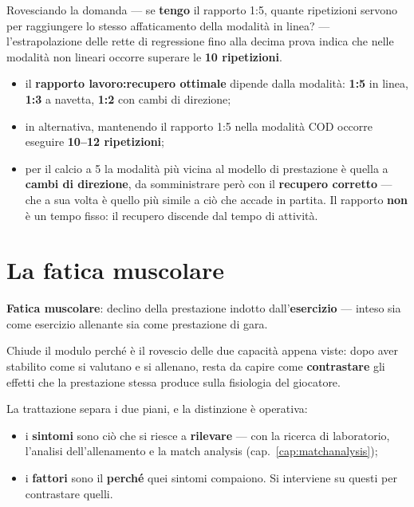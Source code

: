 Rovesciando la domanda --- se \textbf{tengo} il rapporto 1:5, quante ripetizioni servono per
raggiungere lo stesso affaticamento della modalità in linea? --- l'estrapolazione delle rette di
regressione fino alla decima prova indica che nelle modalità non lineari occorre superare le
\textbf{10 ripetizioni}.

\begin{itemize}
  \item il \textbf{rapporto lavoro:recupero ottimale} dipende dalla modalità: \textbf{1:5} in
    linea, \textbf{1:3} a navetta, \textbf{1:2} con cambi di direzione;
  \item in alternativa, mantenendo il rapporto 1:5 nella modalità COD occorre eseguire
    \textbf{10--12 ripetizioni};
  \item per il calcio a 5 la modalità più vicina al modello di prestazione è quella a
    \textbf{cambi di direzione}, da somministrare però con il \textbf{recupero corretto} --- che a
    sua volta è quello più simile a ciò che accade in partita. Il rapporto \textbf{non} è un tempo
    fisso: il recupero discende dal tempo di attività.
\end{itemize}

\section{La fatica muscolare}

\textbf{Fatica muscolare}: declino della prestazione indotto dall'\textbf{esercizio} --- inteso sia
come esercizio allenante sia come prestazione di gara.

Chiude il modulo perché è il rovescio delle due capacità appena viste: dopo aver stabilito come si
valutano e si allenano, resta da capire come \textbf{contrastare} gli effetti che la prestazione
stessa produce sulla fisiologia del giocatore.

La trattazione separa i due piani, e la distinzione è operativa:
\begin{itemize}
  \item i \textbf{sintomi} sono ciò che si riesce a \textbf{rilevare} --- con la ricerca di
    laboratorio, l'analisi dell'allenamento e la match analysis
    (cap.~\ref{cap:matchanalysis});
  \item i \textbf{fattori} sono il \textbf{perché} quei sintomi compaiono. Si interviene su questi
    per contrastare quelli.
\end{itemize}

